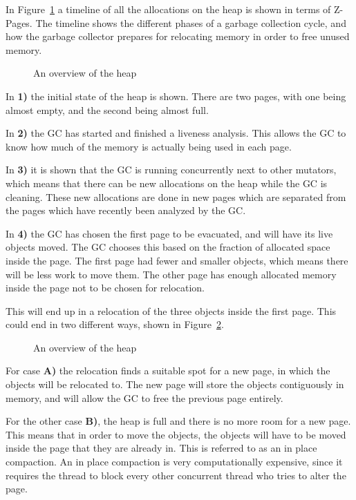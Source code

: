 In Figure~\ref{fig:zgc_timeline} a timeline of all the allocations on the heap is shown in terms of Z-Pages. The timeline shows the different phases of a garbage collection cycle, and how the garbage collector prepares for relocating memory in order to free unused memory.

\begin{figure}[!h]
    \centering
    
    \caption{An overview of the heap}
    \label{fig:zgc_timeline}
\end{figure}

In \textbf{1)} the initial state of the heap is shown. There are two pages, with one being almost empty, and the second being almost full.

In \textbf{2)} the GC has started and finished a liveness analysis. This allows the GC to know how much of the memory is actually being used in each page. 

In \textbf{3)} it is shown that the GC is running concurrently next to other mutators, which means that there can be new allocations on the heap while the GC is cleaning. These new allocations are done in new pages which are separated from the pages which have recently been analyzed by the GC. 

In \textbf{4)} the GC has chosen the first page to be evacuated, and will have its live objects moved. The GC chooses this based on the fraction of allocated space inside the page. The first page had fewer and smaller objects, which means there will be less work to move them. The other page has enough allocated memory inside the page not to be chosen for relocation.

This will end up in a relocation of the three objects inside the first page. This could end in two different ways, shown in Figure~\ref{fig:zreloc}.

\begin{figure}[!h]
    \centering
    
    \caption{An overview of the heap}
    \label{fig:zreloc}
\end{figure}
For case \textbf{A)} the relocation finds a suitable spot for a new page, in which the objects will be relocated to. The new page will store the objects contiguously in memory, and will allow the GC to free the previous page entirely.

For the other case \textbf{B)}, the heap is full and there is no more room for a new page. This means that in order to move the objects, the objects will have to be moved inside the page that they are already in. This is referred to as an in place compaction. An in place compaction is very computationally expensive, since it requires the thread to block every other concurrent thread who tries to alter the page. 
